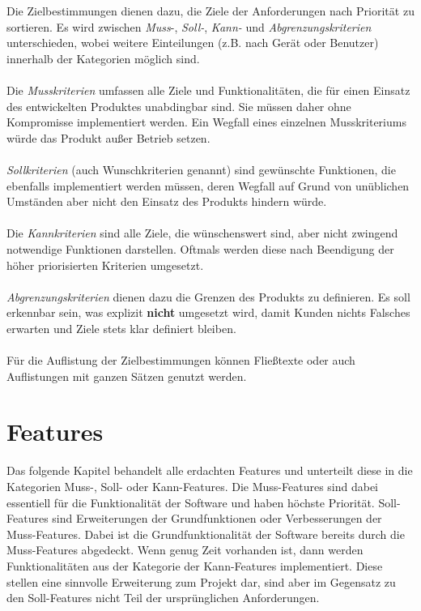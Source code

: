 \begin{tcolorbox}
Die Zielbestimmungen dienen dazu, die Ziele der Anforderungen nach Priorität zu sortieren. 
Es wird zwischen \textit{Muss}-, \textit{Soll-}, \textit{Kann-} und \textit{Abgrenzungskriterien} unterschieden, wobei weitere Einteilungen (z.B. nach Gerät oder Benutzer) innerhalb der Kategorien möglich sind.
%
\\\\
%
Die \textit{Musskriterien} umfassen alle Ziele und Funktionalitäten, die für einen Einsatz des entwickelten Produktes unabdingbar sind.
Sie müssen daher ohne Kompromisse implementiert werden.
Ein Wegfall eines einzelnen Musskriteriums würde das Produkt außer Betrieb setzen.
%
\\\\
%
\textit{Sollkriterien} (auch Wunschkriterien genannt) sind gewünschte Funktionen, die ebenfalls implementiert werden müssen, deren Wegfall auf Grund von unüblichen Umständen aber nicht den Einsatz des Produkts hindern würde.
%
\\\\
%
Die \textit{Kannkriterien} sind alle Ziele, die wünschenswert sind, aber nicht zwingend notwendige Funktionen darstellen. 
Oftmals werden diese nach Beendigung der höher priorisierten Kriterien umgesetzt.
%
\\\\
%
\textit{Abgrenzungskriterien} dienen dazu die Grenzen des Produkts zu definieren.
Es soll erkennbar sein, was explizit \textbf{nicht} umgesetzt wird, damit Kunden nichts Falsches erwarten und Ziele stets klar definiert bleiben.
%
\\\\
%
Für die Auflistung der Zielbestimmungen können Fließtexte oder auch Auflistungen mit ganzen Sätzen genutzt werden. 
\end{tcolorbox}

\section{Features}
Das folgende Kapitel behandelt alle erdachten Features und unterteilt diese in die Kategorien Muss-, Soll- oder Kann-Features. 
Die Muss-Features sind dabei essentiell für die Funktionalität der Software und haben höchste Priorität.
Soll-Features sind Erweiterungen der Grundfunktionen oder Verbesserungen der Muss-Features. Dabei ist die Grundfunktionalität der Software bereits durch die Muss-Features abgedeckt.
Wenn genug Zeit vorhanden ist, dann werden Funktionalitäten aus der Kategorie der Kann-Features implementiert. 
Diese stellen eine sinnvolle Erweiterung zum Projekt dar, sind aber im Gegensatz zu den Soll-Features nicht Teil der ursprünglichen Anforderungen.

